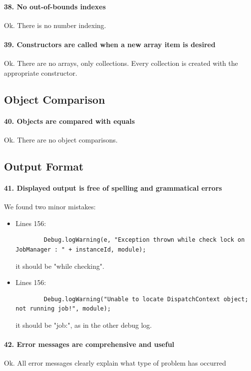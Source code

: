\documentclass[english]{article}
\begin{document}
{{\paragraph{38. No out-of-bounds indexes}
Ok.
There is no number indexing.

\paragraph{39. Constructors are called when a new array item is desired}
Ok.
There are no arrays, only collections. Every collection is created with the appropriate constructor.

\subsection{Object Comparison}
\paragraph{40. Objects are compared with equals}
Ok.
There are no object comparisons.

\subsection{Output Format}
\paragraph{41. Displayed output is free of spelling and grammatical errors}
We found two minor mistakes:

\begin{itemize}
	\item{Lines 156: 
	\begin{lstlisting}
		Debug.logWarning(e, "Exception thrown while check lock on JobManager : " + instanceId, module);
	\end{lstlisting}
	it should be "while checking".}
	\item{Lines 156: 
	\begin{lstlisting}
		Debug.logWarning("Unable to locate DispatchContext object; not running job!", module);
	\end{lstlisting}
	it should be "job:", as in the other debug log.}
\end{itemize}


\paragraph{42. Error messages are comprehensive and useful}
Ok. All error messages clearly explain what type of problem has occurred

}}
\end{document}
